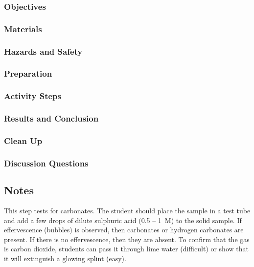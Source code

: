 \subsubsection{Objectives}


\subsubsection{Materials}


\subsubsection{Hazards and Safety}


\subsubsection{Preparation}
\begin{enumerate}
\end{enumerate}

\subsubsection{Activity Steps}
\begin{enumerate}
\end{enumerate}

\subsubsection{Results and Conclusion}


\subsubsection{Clean Up}
\begin{enumerate}
\end{enumerate}


\subsubsection{Discussion Questions}
\begin{enumerate}
\end{enumerate}

\subsection{Notes}

This step tests for carbonates. 
The student should place the sample in a test tube 
and add a few drops of dilute sulphuric acid 
(0.5 -- 1~M) to the solid sample. 
If effervescence (bubbles) is observed, 
then carbonates or hydrogen carbonates are present. 
If there is no effervescence, 
then they are absent. 
To confirm that the gas is carbon dioxide, 
students can pass it through lime water 
(difficult) or show that it will extinguish a glowing splint (easy).


